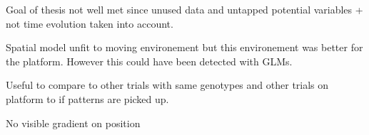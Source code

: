 Goal of thesis not well met since unused data and untapped potential variables + not time evolution taken into account.

Spatial model unfit to moving environement but this environement was better for the platform.
However this could have been detected with GLMs.

Useful to compare to other trials with same genotypes and other trials on platform to if patterns are picked up.

No visible gradient on position